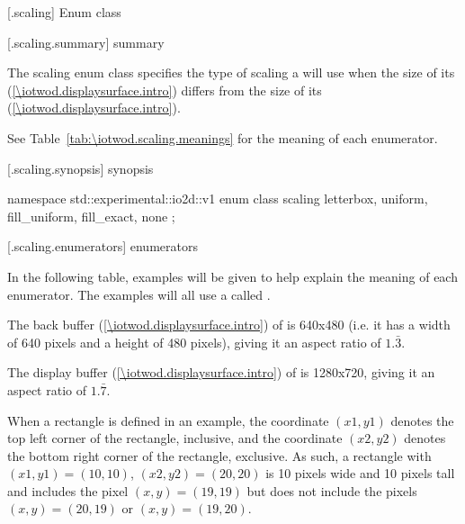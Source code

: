  [\iotwod.scaling] {Enum class }

 [\iotwod.scaling.summary] { summary}

\pnum
The scaling enum class specifies the type of scaling a  
will use when the size of its  (\ref{\iotwod.displaysurface.intro}) differs from the size of its  (\ref{\iotwod.displaysurface.intro}).

\pnum
See Table~\ref{tab:\iotwod.scaling.meanings} for the meaning of each  enumerator.

 [\iotwod.scaling.synopsis] { synopsis}

\begin{codeblock}
namespace std::experimental::io2d::v1 {
  enum class scaling {
    letterbox,
    uniform,
    fill_uniform,
    fill_exact,
    none
  };
}
\end{codeblock}

 [\iotwod.scaling.enumerators] { enumerators}

\pnum
\begin{note}
In the following table, examples will be given to help explain the meaning of each enumerator. The examples will all use a  called .

The back buffer (\ref{\iotwod.displaysurface.intro}) of  is 640x480 (i.e. it has a width of 640 pixels and a height of 480 pixels), giving it an aspect ratio of $1.\bar{3}$.

The display buffer (\ref{\iotwod.displaysurface.intro}) of  is 1280x720, giving it an aspect ratio of $1.\bar{7}$.

When a rectangle is defined in an example, the coordinate $(x1,y1)$ denotes the top left corner of the rectangle, inclusive, and the coordinate $(x2,y2)$ denotes the bottom right corner of the rectangle, exclusive. As such, a rectangle with $(x1,y1) = (10,10)$, $(x2,y2) = (20, 20)$ is 10 pixels wide and 10 pixels tall and includes the pixel $(x,y) = (19,19)$ but does not include the pixels $(x,y) = (20,19)$ or $(x,y) = (19,20)$.
\end{note}

